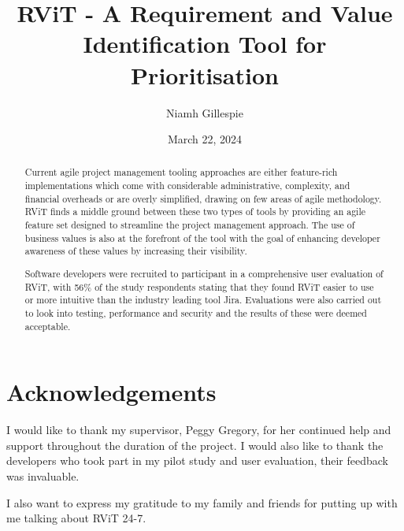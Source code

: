 \documentclass{l4proj}
\begin{document}
\title{RViT - A Requirement and Value Identification Tool for Prioritisation}
\author{Niamh Gillespie}
\date{March 22, 2024}

\maketitle

\begin{abstract}
    Current agile project management tooling approaches are either feature-rich implementations which come with considerable administrative, complexity, and financial overheads or are overly simplified, drawing on few areas of agile methodology. RViT finds a middle ground between these two types of tools by providing an agile feature set designed to streamline the project management approach. The use of business values is also at the forefront of the tool with the goal of enhancing developer awareness of these values by increasing their visibility.

    Software developers were recruited to participant in a comprehensive user evaluation of RViT, with 56$\%$ of the study respondents stating that they found RViT easier to use or more intuitive than the industry leading tool Jira. Evaluations were also carried out to look into testing, performance and security and the results of these were deemed acceptable.
\end{abstract}


\chapter*{Acknowledgements}

I would like to thank my supervisor, Peggy Gregory, for her continued help and support throughout the duration of the project. I would also like to thank the developers who took part in my pilot study and user evaluation, their feedback was invaluable.

I also want to express my gratitude to my family and friends for putting up with me talking about RViT 24-7.

%
%
\def\consentname {Niamh Gillespie} %
\def\consentdate {22 March 2024} %
%
\educationalconsent
\end{document}
